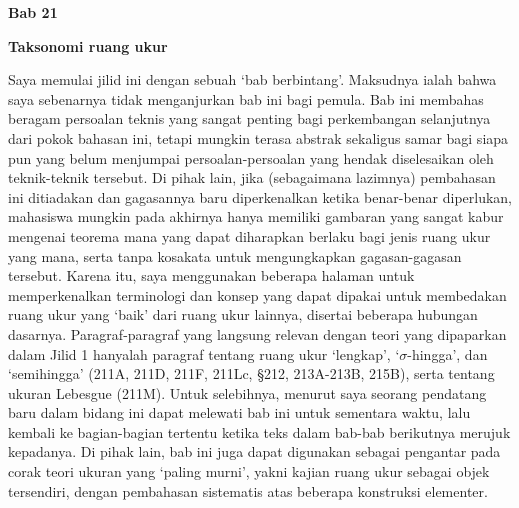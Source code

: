  
\def\chaptername{Taksonomi ruang ukur} 
 
\gdef\topparagraph{} 
   \gdef\bottomparagraph{Bab\ 21 {\it pendahuluan.}} 
   \gdef\newparagraph{Bab\ 21 {\it pendahuluan.}} 
   \gdef\sectionname{Pendahuluan} 
   \gdef\headlinesectionname{Pendahuluan} 
   \centerline{\bf *Bab 21} 
   \medskip 
   \centerline{\bf \chaptername} 
   \medskip 
 
Saya memulai jilid ini dengan sebuah `bab berbintang'. Maksudnya ialah
bahwa saya sebenarnya tidak menganjurkan bab ini bagi pemula. Bab ini
membahas beragam persoalan teknis yang sangat penting bagi perkembangan
selanjutnya dari pokok bahasan ini, tetapi mungkin terasa abstrak
sekaligus samar bagi siapa pun yang belum menjumpai persoalan-persoalan
yang hendak diselesaikan oleh teknik-teknik tersebut. Di pihak lain,
jika (sebagaimana lazimnya) pembahasan ini ditiadakan dan gagasannya
baru diperkenalkan ketika benar-benar diperlukan, mahasiswa mungkin
pada akhirnya hanya memiliki gambaran yang sangat kabur mengenai
teorema mana yang dapat diharapkan berlaku bagi jenis ruang ukur yang
mana, serta tanpa kosakata untuk mengungkapkan gagasan-gagasan tersebut.
Karena itu, saya menggunakan beberapa halaman untuk memperkenalkan
terminologi dan konsep yang dapat dipakai untuk membedakan ruang ukur
yang `baik' dari ruang ukur lainnya, disertai beberapa hubungan dasarnya.
Paragraf-paragraf yang langsung relevan dengan teori yang dipaparkan
dalam Jilid 1 hanyalah paragraf tentang ruang ukur `lengkap',
`$\sigma$-hingga', dan `semihingga' (211A, 211D, 211F, 211Lc, \S212,
213A-213B, 215B), serta tentang ukuran Lebesgue (211M). Untuk selebihnya,
menurut saya seorang pendatang baru dalam bidang ini dapat melewati bab
ini untuk sementara waktu, lalu kembali ke bagian-bagian tertentu
ketika teks dalam bab-bab berikutnya merujuk kepadanya.
Di pihak lain, bab ini juga dapat digunakan sebagai pengantar pada corak
teori ukuran yang `paling murni', yakni kajian ruang ukur sebagai
objek tersendiri, dengan pembahasan sistematis atas beberapa
konstruksi elementer.
 
\discrpage 




